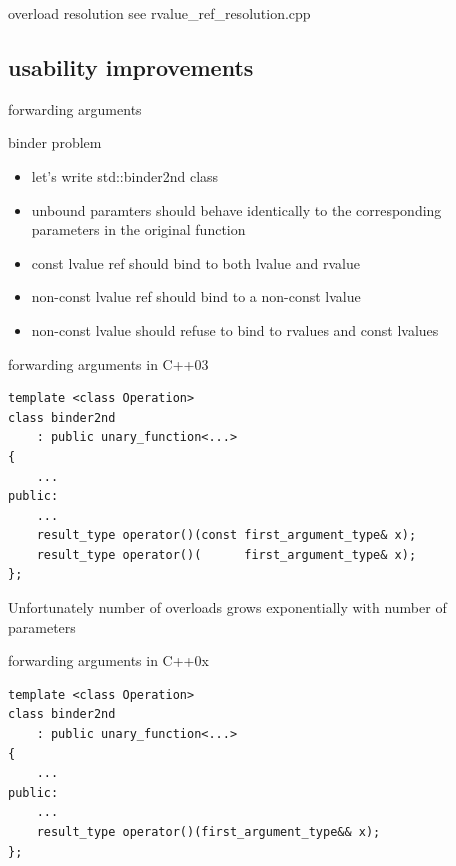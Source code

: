 \documentclass{beamer}
\begin{document}
\begin{frame}{overload resolution}
  see rvalue\_ref\_resolution.cpp
\end{frame}

\subsection{usability improvements}
\begin{frame}{forwarding arguments}
  \begin{block}{binder problem}
    \begin{itemize}
    \item let's write std::binder2nd class
    \item unbound paramters should behave identically to the corresponding parameters in the original function
    \item const lvalue ref should bind to both lvalue and rvalue
    \item non-const lvalue ref should bind to a non-const lvalue
    \item non-const lvalue should refuse to bind to rvalues and const lvalues
    \end{itemize}
  \end{block}
\end{frame}

\begin{frame}[fragile]{forwarding arguments in C++03}
\begin{verbatim}
template <class Operation>
class binder2nd
    : public unary_function<...>
{
    ...
public:
    ...
    result_type operator()(const first_argument_type& x);
    result_type operator()(      first_argument_type& x);
};

\end{verbatim}
\begin{block}{}
  Unfortunately number of overloads grows exponentially with number of
  parameters
\end{block}
\end{frame}

\begin{frame}[fragile]{forwarding arguments in C++0x}
  \begin{block}{}
\begin{verbatim}
template <class Operation>
class binder2nd
    : public unary_function<...>
{
    ...
public:
    ...
    result_type operator()(first_argument_type&& x);
};

\end{verbatim}
  \end{block}
\end{frame}
\end{document}
